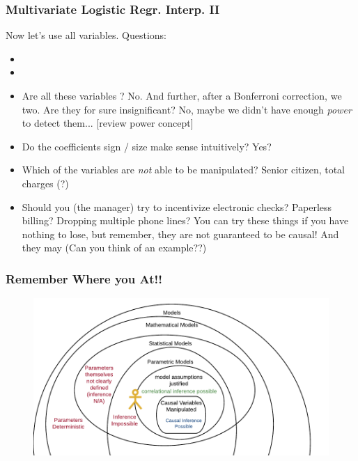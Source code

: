 \documentclass[slides]{beamer} %
\begin{document}
\begin{frame}\frametitle{Multivariate Logistic Regr. Interp. II}

\small
Now let's use all variables. Questions:

\begin{itemize}
\item {}
\item {}
\item Are all these variables ? \pause No. And further, after a Bonferroni correction, we  two. Are they for sure insignificant? \pause No, maybe we didn't have enough \emph{power} to detect them... [review power concept]
\item Do the coefficients sign / size make sense intuitively? \pause Yes?
\item Which of the  variables are \textit{not} able to be manipulated? \pause Senior citizen, total charges (?) \pause
\item Should you (the manager) try to incentivize electronic checks? \pause Paperless billing? \pause Dropping multiple phone lines? \pause You can try these things if you have nothing to lose, but remember, they are not guaranteed to be causal! And they may  (Can you think of an example??)
\end{itemize}

\end{frame}

\begin{frame}\frametitle{Remember Where you At!!}

\begin{figure}
\centering
\includegraphics[width=4.75in]{where_we_at}
\end{figure}

	
\end{frame}
\end{document}
